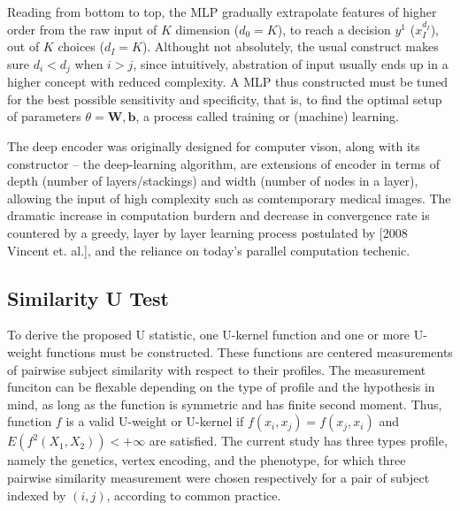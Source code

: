 \documentclass[twocolumn]{article}
\begin{document}
Reading from bottom to top, the MLP gradually extrapolate features of higher order from the raw input of $K$ dimension ($d_0=K$), to reach a decision $y^1$ ($x_I^{d_I}$), out of $K$ choices ($d_I=K$). Althought not absolutely, the usual construct makes sure $d_i<d_j$ when $i>j$, since intuitively, abstration of input usually ends up in a higher concept with reduced complexity.
A MLP thus constructed must be tuned for the best possible sensitivity and specificity, that is, to find the optimal setup of parameters $\theta={\boldsymbol{W},\boldsymbol{b}}$, a process called training or (machine) learning.

The deep encoder was originally designed for computer vison, along with its constructor -- the deep-learning algorithm, are extensions of encoder in terms of depth (number of layers/stackings) and width (number of nodes in a layer), allowing the input of high complexity such as comtemporary medical images. The dramatic increase in computation burdern and decrease in convergence rate is countered by a greedy, layer by layer learning process postulated by [2008 Vincent et. al.], and the reliance on today's parallel computation techenic.


\subsection{Similarity U Test}
  To derive the proposed U statistic, one U-kernel function and one or more U-weight functions must be constructed. These functions are centered measurements of pairwise subject similarity with respect to their profiles. The measurement funciton can be flexable depending on the type of profile and the hypothesis in mind, as long as the function is symmetric and has finite second moment. Thus, function $f$ is a valid U-weight or U-kernel if $f(x_i,x_j)=f(x_j,x_i)$ and $E(f^2(X_1, X_2))<+\infty$ are satisfied. The current study has three types profile, namely the genetics, vertex encoding, and the phenotype, for which three pairwise similarity measurement were chosen respectively for a pair of subject indexed by $(i,j)$, according to common practice.
\end{document}
